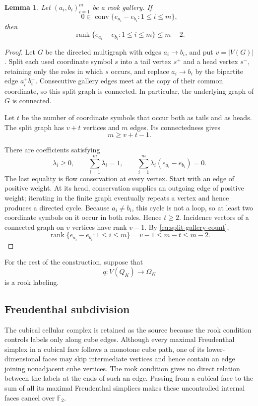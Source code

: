 \documentclass[reqno,12pt]{amsart}
\newtheorem{lemma}[theorem]{Lemma}
\theoremstyle{definition}
\DeclareMathOperator{\conv}{conv}
\DeclareMathOperator{\rank}{rank}
\newcommand{\F}{\mathbb F_2}
\begin{document}
\begin{lemma}
\label{lem:gallery-rank}
Let \((a_i,b_i)_{i=1}^m\) be a rook gallery. If
\[
 0\in\conv\{e_{a_i}-e_{b_i}:1\leq i\leq m\},
\]
then
\[
 \rank\{e_{a_i}-e_{b_i}:1\leq i\leq m\}\leq m-2.
\]
\end{lemma}

\begin{proof}
Let \(G\) be the directed multigraph with edges \(a_i\to b_i\), and
put \(v=|V(G)|\). Split each used coordinate symbol \(s\) into a tail
vertex \(s^+\) and a head vertex \(s^-\), retaining only the roles in
which \(s\) occurs, and replace \(a_i\to b_i\) by the bipartite edge
\(a_i^+b_i^-\). Consecutive gallery edges meet at the copy of their
common coordinate, so this split graph is connected. In particular,
the underlying graph of \(G\) is connected.

Let \(t\) be the number of coordinate symbols that occur both as tails
and as heads. The split graph has \(v+t\) vertices and \(m\) edges.
Its connectedness gives
\begin{equation}\label{eq:split-gallery-count}
 m\geq v+t-1.
\end{equation}

There are coefficients satisfying
\[
 \lambda_i\geq0,\qquad
 \sum_{i=1}^m\lambda_i=1,
 \qquad
 \sum_{i=1}^m\lambda_i(e_{a_i}-e_{b_i})=0.
\]
The last equality is flow conservation at every vertex. Start with
an edge of positive weight. At its head, conservation supplies an
outgoing edge of positive weight; iterating in the finite graph
eventually repeats a vertex and hence produces a directed cycle.
Because \(a_i\ne b_i\), this cycle is not a loop, so at least two
coordinate symbols on it occur in both roles. Hence \(t\geq2\).
Incidence vectors of a connected graph on \(v\) vertices have rank
\(v-1\). By \eqref{eq:split-gallery-count},
\[
 \rank\{e_{a_i}-e_{b_i}:1\leq i\leq m\}
 =v-1\leq m-t\leq m-2.
\]
\end{proof}

For the rest of the construction, suppose that
\begin{equation*}
 q:V(Q_K)\longrightarrow\Omega_K
\end{equation*}
is a rook labeling.

\subsection{Freudenthal subdivision}

The cubical cellular complex is retained as the source because the
rook condition controls labels only along cube edges.  Although every
maximal Freudenthal simplex in a cubical face follows a monotone cube
path, one of its lower-dimensional faces may skip intermediate
vertices and hence contain an edge joining nonadjacent cube vertices.
The rook condition gives no direct relation between the labels at the
ends of such an edge.  Passing from a cubical face to the sum of all
its maximal Freudenthal simplices makes these uncontrolled internal
faces cancel over \(\F\).
\end{document}
